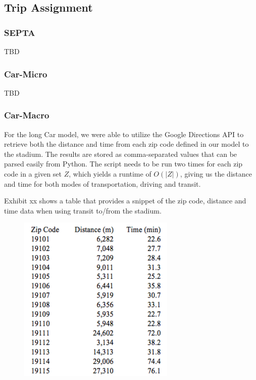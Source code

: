 \subsection{Trip Assignment}

\subsubsection{SEPTA}

TBD

\subsubsection{Car-Micro}

TBD

\subsubsection{Car-Macro}

For the long Car model, we were able to utilize the Google Directions
API to retrieve both the distance and time from each zip code defined
in our model to the stadium. The results are stored as comma-separated
values that can be parsed easily from Python. The script needs to be
run two times for each zip code in a given set $Z$, which yields a
runtime of $O(|Z|)$, giving us the distance and time for both modes of
transportation, driving and transit.

Exhibit xx shows a table that provides a snippet of the zip code,
distance and time data when using transit to/from the stadium.

\begin{figure}[htp]
  \centering
  \includegraphics[height=8cm]{graphics/car-macro-ex.png}
  \caption{}
\end{figure}

